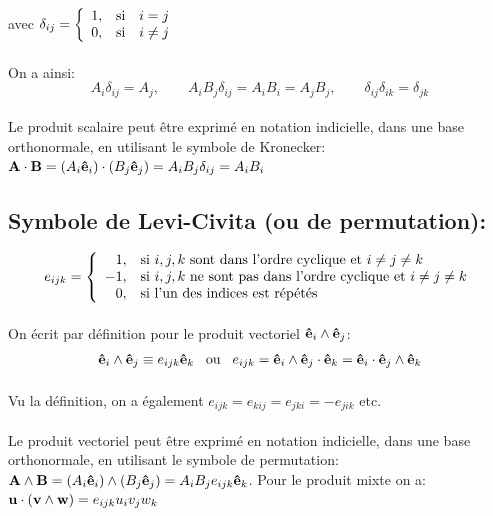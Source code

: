 avec $\delta_{ij}=\left\{
	\begin{array}{l c c}
		1, & \text{si} & i=j\\
		0, & \text{si} & i\neq j\\
	\end{array}\right.$
\paragraph{} On a ainsi: $$A_i\delta_{ij}=A_j, \qquad A_iB_j\delta_{ij}=A_iB_i=A_jB_j, \qquad \delta_{ij}\delta_{ik}=\delta_{jk}$$

\paragraph{} Le produit scalaire peut être exprimé en notation indicielle, dans une base orthonormale, en utilisant le symbole de Kronecker: $\textbf{A}\cdot\textbf{B}=(A_i\textbf{ê}_i)\cdot(B_j\textbf{ê}_j) = A_iB_j\delta_{ij}=A_iB_i$

\subsection{Symbole de Levi-Civita (ou de permutation):}
$$e_{ijk}=\left\{
\begin{array}{r l}
	1, & \text{si }i,j,k \text{ sont dans l'ordre cyclique et }i\neq j\neq k\\
	-1, & \text{si }i,j,k \text{ ne sont pas dans l'ordre cyclique et } i\neq j\neq k\\
	0, & \text{si l'un des indices est répétés}
\end{array} \right.$$
\paragraph{}
On écrit par définition pour le produit vectoriel $\textbf{ê}_i\wedge\textbf{ê}_j$: $$\textbf{ê}_i\wedge\textbf{ê}_j\equiv e_{ijk}\textbf{ê}_k\hspace{0.3cm} \text{ou} \hspace{0.3cm} e_{ijk}=\textbf{ê}_i\wedge \textbf{ê}_j \cdot \textbf{ê}_k=\textbf{ê}_i\cdot \textbf{ê}_j \wedge \textbf{ê}_k$$
\paragraph{}
Vu la définition, on a également $e_{ijk} = e_{kij} = e_{jki} = -e_{jik} \text{ etc.}$
\paragraph{}Le produit vectoriel peut être exprimé en notation indicielle, dans une base orthonormale, en utilisant le symbole de permutation: $\textbf{A}\wedge\textbf{B}=(A_i\textbf{ê}_i)\wedge(B_j\textbf{ê}_j) = A_iB_je_{ijk}\textbf{ê}_k$. Pour le produit mixte on a: $\textbf{u}\cdot(\textbf{v}\wedge\textbf{w})=e_{ijk}u_iv_jw_k$
